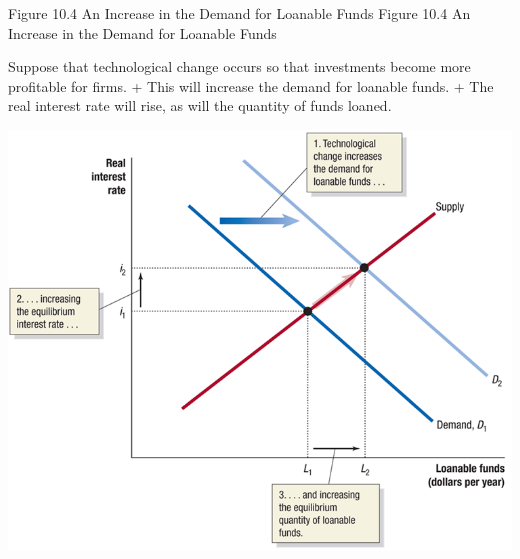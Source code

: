 \documentclass[
  12pt,
  ignorenonframetext,
]{beamer}
\begin{document}
\begin{frame}{Figure 10.4 An Increase in the Demand for Loanable Funds}
\label{figure-10.4-an-increase-in-the-demand-for-loanable-funds}
Figure 10.4 An Increase in the Demand for Loanable Funds

Suppose that technological change occurs so that investments become more
profitable for firms. + This will increase the demand for loanable
funds. + The real interest rate will rise, as will the quantity of funds
loaned.

\includegraphics[width=\textwidth,height=0.99\textheight]{imgs3/img_slide28a.png}
\end{frame}
\end{document}
